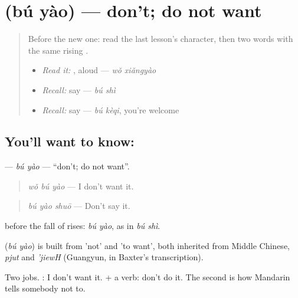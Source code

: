 \section[\texorpdfstring{\zh{不要} (bú yào)}{不要 (bú yào)}]{ (bú yào) — don't; do not want}

\label{lesson:ZH-C91-buyao}



\begin{quote}
Before the new one: read the last lesson's character, then two words with the same rising .

\begin{itemize}
\raggedright
  \item \emph{Read it:} , aloud — \emph{wǒ xiǎngyào}
  \item \emph{Recall:} say  — \emph{bú shì}
  \item \emph{Recall:} say  — \emph{bú kèqi}, you're welcome
\end{itemize}
\end{quote}

\subsection*{You'll want to know: }
\textbf{} — \emph{bú yào} — \textquotedblleft{}don't; do not want\textquotedblright{}.

\begin{quote}
\textbf{} \emph{wǒ bú yào} — I don't want it.
\end{quote}

\begin{quote}
\textbf{} \emph{bú yào shuō} — Don't say it.
\end{quote}

 before the fall of  rises: \emph{bú yào}, as in \emph{bú shì}.

\begin{cousinweb}
\textbf{} (\emph{bú yào}) is built from  'not' and  'to want', both inherited from Middle Chinese, \emph{pjut} and \emph{'jiewH} (Guangyun, in Baxter's transcription).
\end{cousinweb}

\begin{grammarlens}[title={What you've built}]
Two jobs. : I don't want it.  + a verb: don't do it. The second is how Mandarin tells somebody not to.
\end{grammarlens}

